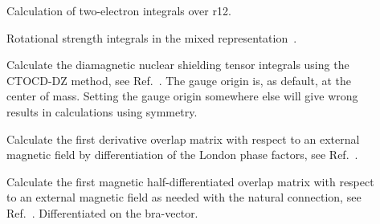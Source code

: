 \begin{description}
\item[] Calculation of two-electron integrals over r12.

\item[] Rotational strength integrals in the mixed
representation~\cite{tbphkkrjcp110}.


\item[] Calculate the diamagnetic nuclear shielding tensor 
integrals using the CTOCD-DZ method,
see Ref.~\cite{paololazz1,paololazz2,ctocd}. 
The gauge origin is, as default, at the center of mass. 
Setting the gauge origin somewhere else will give wrong results in calculations using symmetry.



\item[] Calculate the first derivative overlap
matrix with respect to an
external magnetic field by differentiation
of the London phase factors, see Ref.~\cite{thpjjcp95}.


\item[] Calculate the first magnetic half-differentiated overlap
matrix with respect to an
external magnetic field as needed with the
natural connection, see
Ref.~\cite{krthklbpjjocp195}. Differentiated
on the bra-vector.


\end{description}
